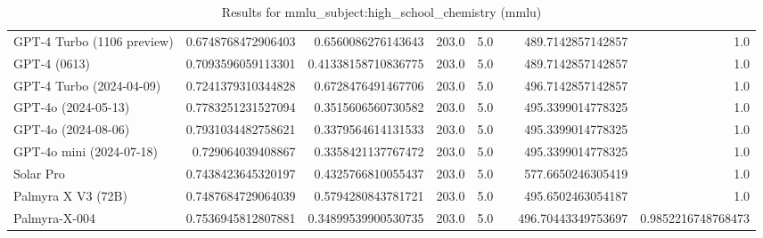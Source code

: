 \begin{table}[htp]
{\begin{tabular}{lrrrrrrr}
GPT-4 Turbo (1106 preview) & 0.6748768472906403 & 0.6560086276143643 & 203.0 & 5.0 &  & 489.7142857142857 & 1.0 \\
GPT-4 (0613) & 0.7093596059113301 & 0.41338158710836775 & 203.0 & 5.0 &  & 489.7142857142857 & 1.0 \\
GPT-4 Turbo (2024-04-09) & 0.7241379310344828 & 0.6728476491467706 & 203.0 & 5.0 &  & 496.7142857142857 & 1.0 \\
GPT-4o (2024-05-13) & 0.7783251231527094 & 0.3515606560730582 & 203.0 & 5.0 &  & 495.3399014778325 & 1.0 \\
GPT-4o (2024-08-06) & 0.7931034482758621 & 0.3379564614131533 & 203.0 & 5.0 &  & 495.3399014778325 & 1.0 \\
GPT-4o mini (2024-07-18) & 0.729064039408867 & 0.3358421137767472 & 203.0 & 5.0 &  & 495.3399014778325 & 1.0 \\
Solar Pro & 0.7438423645320197 & 0.4325766810055437 & 203.0 & 5.0 &  & 577.6650246305419 & 1.0 \\
Palmyra X V3 (72B) & 0.7487684729064039 & 0.5794280843781721 & 203.0 & 5.0 &  & 495.6502463054187 & 1.0 \\
Palmyra-X-004 & 0.7536945812807881 & 0.34899539900530735 & 203.0 & 5.0 &  & 496.70443349753697 & 0.9852216748768473 \\
\bottomrule
\end{tabular}}
\caption{Results for mmlu_subject:high_school_chemistry (mmlu)}
\label{fig:mmlu_subject:high_school_chemistry (mmlu)}
\end{table}